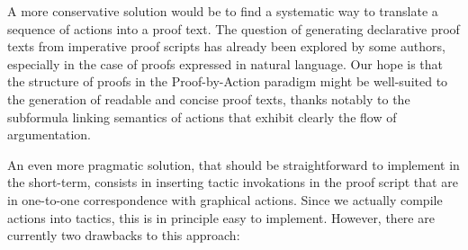 A more conservative solution would be to find a systematic way to translate a
sequence of actions into a proof text. The question of generating declarative
proof texts from imperative proof scripts has already been explored by some
authors, especially in the case of proofs expressed in natural
language. Our hope is that the structure of proofs
in the Proof-by-Action paradigm might be well-suited to the generation of
readable and concise proof texts, thanks notably to the subformula linking
semantics of  actions that exhibit clearly the flow of argumentation.

An even more pragmatic solution, that should be straightforward to implement in
the short-term, consists in inserting tactic invokations in the proof script
that are in one-to-one correspondence with graphical actions. Since we actually
compile actions into tactics, this is in principle easy to implement. However,
there are currently two drawbacks to this approach:
